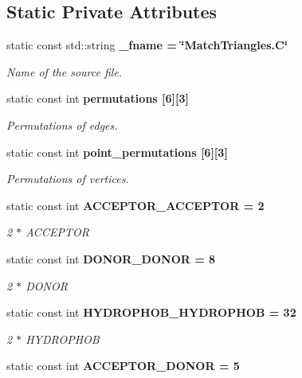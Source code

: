 \subsection*{Static Private Attributes}
\begin{CompactItemize}
\item 
static const std::string \bf{\_\-fname} = \char`\"{}Match\-Triangles.C\char`\"{}\label{classASCbase_1_1MatchTriangles_263da86497b71a67e4cb0b14356e830d}

\begin{CompactList}\small\item\em Name of the source file. \item\end{CompactList}\item 
static const int \bf{permutations} [6][3]
\begin{CompactList}\small\item\em Permutations of edges. \item\end{CompactList}\item 
static const int \bf{point\_\-permutations} [6][3]
\begin{CompactList}\small\item\em Permutations of vertices. \item\end{CompactList}\item 
static const int \bf{ACCEPTOR\_\-ACCEPTOR} = 2\label{classASCbase_1_1MatchTriangles_987dee7263175dc5dac58309ca26d4eb}

\begin{CompactList}\small\item\em 2 $\ast$ ACCEPTOR \item\end{CompactList}\item 
static const int \bf{DONOR\_\-DONOR} = 8\label{classASCbase_1_1MatchTriangles_b78b92259f4ef3245675fdf17a21f6c9}

\begin{CompactList}\small\item\em 2 $\ast$ DONOR \item\end{CompactList}\item 
static const int \bf{HYDROPHOB\_\-HYDROPHOB} = 32\label{classASCbase_1_1MatchTriangles_ff621328272ce0e2c143efe4315feb9c}

\begin{CompactList}\small\item\em 2 $\ast$ HYDROPHOB \item\end{CompactList}\item 
static const int \bf{ACCEPTOR\_\-DONOR} = 5\label{classASCbase_1_1MatchTriangles_ade24f76f84d429853f48e41208db45e}


\end{CompactItemize}
